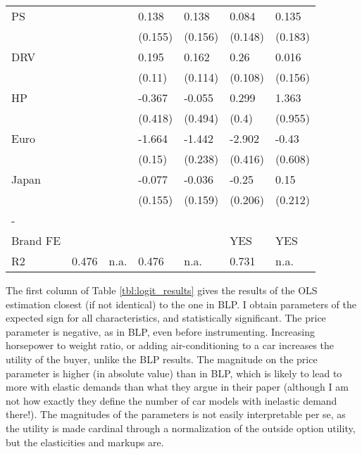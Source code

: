 \documentclass{article}\usepackage[]{graphicx}\usepackage[]{color}
\begin{document}
\begin{table}[ht]
\begin{tabular}{lllllll}
  PS &  &  & 0.138 & 0.138 & 0.084 & 0.135 \\ 
   &  &  & (0.155) & (0.156) & (0.148) & (0.183) \\ 
  DRV &  &  & 0.195 & 0.162 & 0.26 & 0.016 \\ 
   &  &  & (0.11) & (0.114) & (0.108) & (0.156) \\ 
  HP &  &  & -0.367 & -0.055 & 0.299 & 1.363 \\ 
   &  &  & (0.418) & (0.494) & (0.4) & (0.955) \\ 
  Euro &  &  & -1.664 & -1.442 & -2.902 & -0.43 \\ 
   &  &  & (0.15) & (0.238) & (0.416) & (0.608) \\ 
  Japan &  &  & -0.077 & -0.036 & -0.25 & 0.15 \\ 
   &  &  & (0.155) & (0.159) & (0.206) & (0.212) \\ 
  - &  &  &  &  &  &  \\ 
  Brand FE &  &  &  &  & YES & YES \\ 
  R2 & 0.476 & n.a. & 0.476 & n.a. & 0.731 & n.a. \\ 
   \bottomrule 
\end{tabular}
\endgroup
\end{table}

%

The first column of Table \ref{tbl:logit_results} gives the results of the OLS estimation closest (if not identical) to the one in BLP. I obtain parameters of the expected sign for all characteristics, and statistically significant. The price parameter is negative, as in BLP, even before instrumenting. Increasing horsepower to weight ratio, or adding air-conditioning to a car increases the utility of the buyer, unlike the BLP results. The magnitude on the price parameter is higher (in absolute value) than in BLP, which is likely to lead to more with elastic demands than what they argue in their paper (although I am not how exactly they define the number of car models with inelastic demand there!). The magnitudes of the parameters is not easily interpretable per se, as the utility is made cardinal through a normalization of the outside option utility, but the elasticities and markups are. 
\end{document}
